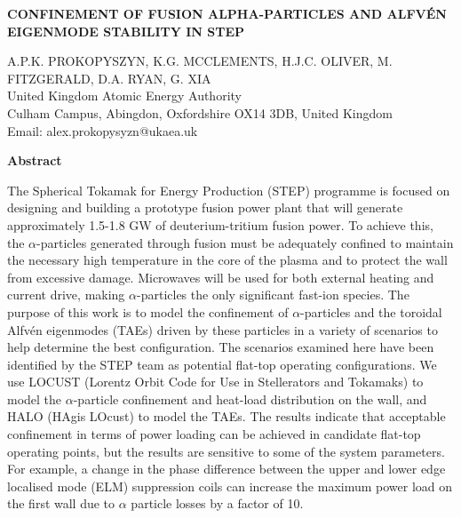 \documentclass[10pt, a4paper, twoside]{article}
\begin{document}
\begin{flushleft}
\fontsize{12}{14}\selectfont \textbf{CONFINEMENT OF FUSION ALPHA-PARTICLES AND ALFV\'EN EIGENMODE STABILITY IN STEP}

\fontsize{10}{13}\selectfont
A.P.K. PROKOPYSZYN, K.G. MCCLEMENTS, H.J.C. OLIVER, M. FITZGERALD, D.A. RYAN, G. XIA \\
United Kingdom Atomic Energy Authority \\
Culham Campus, Abingdon, Oxfordshire OX14 3DB, United Kingdom \\
Email: alex.prokopysyzn@ukaea.uk

\end{flushleft}

\begin{flushleft}
\textbf{Abstract}
\end{flushleft}

\setlength{\parindent}{1cm}
\fontsize{9}{12}\selectfont

The Spherical Tokamak for Energy Production (STEP) programme is focused on designing and building a prototype fusion power plant that will generate approximately 1.5-1.8 GW of deuterium-tritium fusion power. To achieve this, the $\alpha$-particles generated through fusion must be adequately confined to maintain the necessary high temperature in the core of the plasma and to protect the wall from excessive damage. Microwaves will be used for both external heating and current drive, making $\alpha$-particles the only significant fast-ion species. The purpose of this work is to model the confinement of $\alpha$-particles and the toroidal Alfvén eigenmodes (TAEs) driven by these particles in a variety of scenarios to help determine the best configuration. The scenarios examined here have been identified by the STEP team as potential flat-top operating configurations. We use LOCUST (Lorentz Orbit Code for Use in Stellerators and Tokamaks) to model the $\alpha$-particle confinement and heat-load distribution on the wall, and HALO (HAgis LOcust) to model the TAEs. The results indicate that acceptable confinement in terms of power loading can be achieved in candidate flat-top operating points, but the results are sensitive to some of the system parameters. For example, a change in the phase difference between the upper and lower edge localised mode (ELM) suppression coils can increase the maximum power load on the first wall due to $\alpha$ particle losses by a factor of 10.
\end{document}
